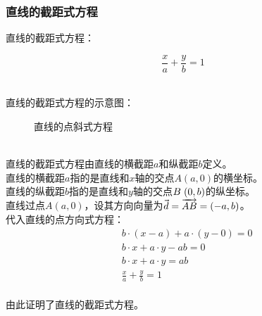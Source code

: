 \documentclass[UTF8]{ctexart}
\let\nvec\vec
\def\vec#1{\nvec{\vphantom b\smash{#1}}}
\begin{document}
\newpage

\subsubsection{直线的截距式方程}
    \setcounter{equation}{0}
    直线的截距式方程：
    \begin{large}
        \begin{equation*}
            \frac{x}{a}+\frac{y}{b}=1
        \end{equation*}
    \end{large}\\
    直线的截距式方程的示意图：
    \begin{figure}[h]
        \begin{center}
            \caption{直线的点斜式方程}
        \end{center}
    \end{figure}\\
    直线的截距式方程由直线的横截距$a$和纵截距$b$定义。\\[3mm]
    直线的横截距$a$指的是直线和$x$轴的交点$A(a,0)$的横坐标。\\[3mm]
    直线的纵截距$b$指的是直线和$y$轴的交点$B\hspace{3.0pt}(0,b)$的纵坐标。\\[6mm]
    直线过点$A(a,0)$，设其方向向量为$\vec{d}=\overrightarrow{AB}=(-a,b)$。\\[3mm]
    代入直线的点方向式方程：
    \begin{align}
        &b\cdot(x-a)+a\cdot(y-0)=0\\[2.0mm]
        &b\cdot x+a\cdot y-ab=0\\[2.0mm]
        &b\cdot x+a\cdot y=ab\\[2.0mm]
        &\frac{x}{a}+\frac{y}{b}=1
    \end{align}\\
    由此证明了直线的截距式方程。
\end{document}
